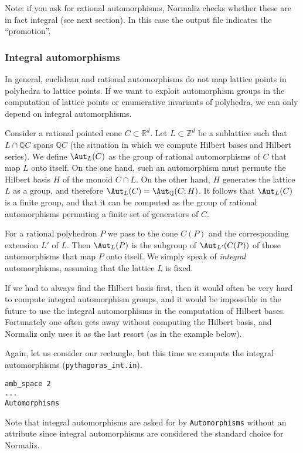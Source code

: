 \documentclass[12pt,a4paper]{scrartcl}
\theoremstyle{definition}
\def\ZZ{{\mathbb Z}}
\def\QQ{{\mathbb Q}}
\def\RR{{\mathbb R}}
\begin{document}
Note: if you ask for rational automorphisms, Normaliz checks whether these are in fact integral (see next section). In this case the output file indicates the ``promotion''.

\subsubsection{Integral automorphisms}

In general, euclidean and rational automorphisms do not map lattice points in polyhedra to lattice points. If we want to exploit automorphism groups in the computation of lattice points or enumerative invariants of polyhedra, we can only depend on integral automorphisms.

Consider a rational pointed cone $C\subset\RR^d$. Let $L\subset\ZZ^d$ be a sublattice such that $L\cap \QQ C$ spans $\QQ C$ (the situation in which we compute Hilbert bases and Hilbert series). We define $\Aut_L(C)$ as the group of rational automorphisms of $C$ that map $L$ onto itself. On the one hand, such an automorphism must permute the Hilbert basis $H$ of the monoid $C\cap L$. On the other hand, $H$ generates the lattice $L$ as a group, and therefore $\Aut_L(C)=\Aut_\QQ(C;H)$. It follows that $\Aut_L(C)$ is a finite group, and that it can be computed as the group of rational automorphisms permuting a finite set of generators of $C$.

For a rational polyhedron $P$ we pass to the cone $C(P)$ and the corresponding extension $L'$ of $L$. Then $\Aut_L(P)$ is the subgroup of $\Aut_{L'}(C(P))$ of those automorphisms that map $P$ onto itself. We simply speak of \emph{integral} automorphisms, assuming that the lattice $L$ is fixed.

If we had to always find the Hilbert basis first, then it would often be very hard to compute integral automorphism groups, and it would be impossible in the future to use the integral automorphisms in the computation of Hilbert bases. Fortunately one often gets away without computing the Hilbert basis, and Normaliz only uses it as the last resort (as in the example below).

Again, let us consider our rectangle, but this time we compute the integral automorphisms (\verb|pythagoras_int.in|).
\begin{Verbatim}
amb_space 2
...
Automorphisms
\end{Verbatim}
Note that integral automorphisms are asked for by \verb|Automorphisms| without an attribute since integral automorphisms are considered the standard choice for Normaliz.
\end{document}
